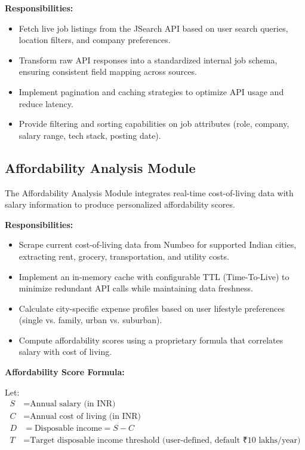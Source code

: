 \textbf{Responsibilities:}
\begin{itemize}
    \item Fetch live job listings from the JSearch API based on user search queries, location filters, and company preferences.
    \item Transform raw API responses into a standardized internal job schema, ensuring consistent field mapping across sources.
    \item Implement pagination and caching strategies to optimize API usage and reduce latency.
    \item Provide filtering and sorting capabilities on job attributes (role, company, salary range, tech stack, posting date).
\end{itemize}

\subsection{Affordability Analysis Module}

The Affordability Analysis Module integrates real-time cost-of-living data with salary information to produce personalized affordability scores.

\textbf{Responsibilities:}
\begin{itemize}
    \item Scrape current cost-of-living data from Numbeo for supported Indian cities, extracting rent, grocery, transportation, and utility costs.
    \item Implement an in-memory cache with configurable TTL (Time-To-Live) to minimize redundant API calls while maintaining data freshness.
    \item Calculate city-specific expense profiles based on user lifestyle preferences (single vs. family, urban vs. suburban).
    \item Compute affordability scores using a proprietary formula that correlates salary with cost of living.
\end{itemize}

\textbf{Affordability Score Formula:}

Let:
\begin{align*}
S &= \text{Annual salary (in INR)} \\
C &= \text{Annual cost of living (in INR)} \\
D &= \text{Disposable income} = S - C \\
T &= \text{Target disposable income threshold (user-defined, default ₹10 lakhs/year)}
\end{align*}

